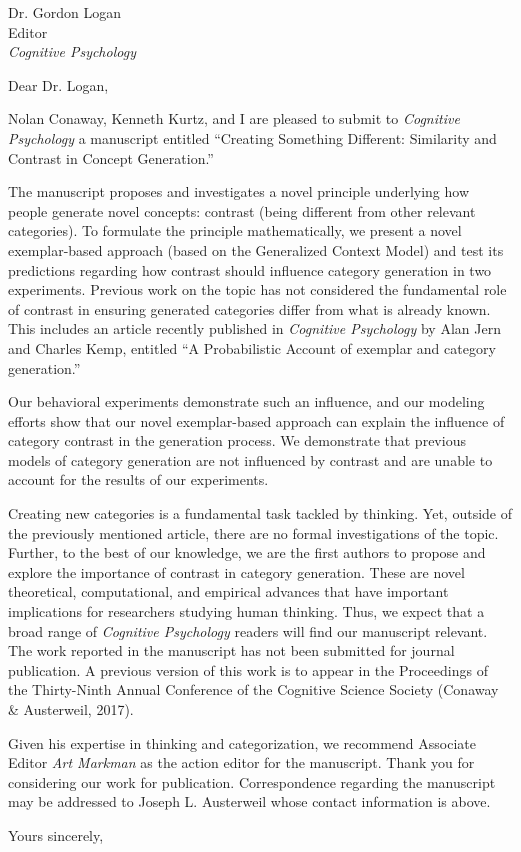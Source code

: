 \documentclass{letter}
\begin{document}
\date{June 17 2017}
\begin{letter}{Dr. Gordon Logan \\ Editor \\ {\em Cognitive Psychology}}

\vspace{30mm}

\opening{Dear Dr. Logan,}


Nolan Conaway, Kenneth Kurtz, and I are pleased to submit to {\em Cognitive Psychology} a manuscript entitled ``Creating Something Different: Similarity and Contrast in Concept Generation.''

The manuscript proposes and investigates a novel principle underlying how people generate novel concepts: contrast (being different from other relevant categories). To formulate the principle mathematically, we present a novel exemplar-based approach (based on the Generalized Context Model) and test its predictions regarding how contrast should influence category generation in two experiments. Previous work on the topic has not considered the fundamental role of contrast in ensuring generated categories differ from what is already known. This includes an article recently published in {\em Cognitive Psychology} by Alan Jern and Charles Kemp, entitled ``A Probabilistic Account of exemplar and category generation.'' 

Our behavioral experiments demonstrate such an influence, and our modeling efforts show that our novel exemplar-based approach can explain the influence of category contrast in the generation process. We demonstrate that previous models of category generation are not influenced by contrast and are unable to account for the results of our experiments.

Creating new categories is a fundamental task tackled by thinking. Yet, outside of the previously mentioned article, there are no formal investigations of the topic. Further, to the best of our knowledge, we are the first authors to propose and explore the importance of contrast in category generation. These are novel theoretical, computational, and empirical advances that have important implications for researchers studying human thinking. Thus, we expect that a broad range of {\em Cognitive Psychology} readers will find our manuscript relevant. The work reported in the manuscript has not been submitted for journal publication. A previous version of this work is to appear in the Proceedings of the Thirty-Ninth Annual Conference of the Cognitive Science Society (Conaway \& Austerweil, 2017).

Given his expertise in thinking and categorization, we recommend Associate Editor {\em Art Markman} as the action editor for the manuscript. Thank you for considering our work for publication. Correspondence regarding the manuscript may be addressed to Joseph L. Austerweil whose contact information is above.

\closing{Yours sincerely,}

\end{letter}
\end{document}
